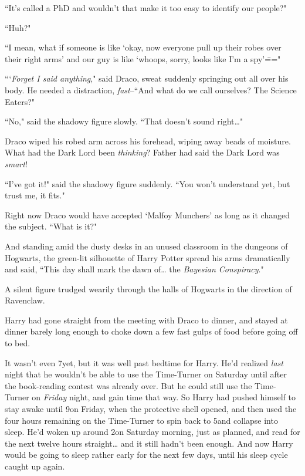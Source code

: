 ``It's called a PhD and wouldn't that make it too easy to identify our people?"

``Huh?"

``I mean, what if someone is like `okay, now everyone pull up their robes over their right arms' and our guy is like `whoops, sorry, looks like I'm a spy'\==="

```\emph{Forget I said anything}," said Draco, sweat suddenly springing out all over his body. He needed a distraction, \emph{fast}\---``And what do we call ourselves? The Science Eaters?"

``No," said the shadowy figure slowly. ``That doesn't sound right{\ldots}"

Draco wiped his robed arm across his forehead, wiping away beads of moisture. What had the Dark Lord been \emph{thinking}? Father had said the Dark Lord was \emph{smart}!

``I've got it!" said the shadowy figure suddenly. ``You won't understand yet, but trust me, it fits."

Right now Draco would have accepted `Malfoy Munchers' as long as it changed the subject. ``What is it?"

And standing amid the dusty desks in an unused classroom in the dungeons of Hogwarts, the green-lit silhouette of Harry Potter spread his arms dramatically and said, ``This day shall mark the dawn of{\ldots} the \emph{Bayesian Conspiracy}."

\later

A silent figure trudged wearily through the halls of Hogwarts in the direction of Ravenclaw.

Harry had gone straight from the meeting with Draco to dinner, and stayed at dinner barely long enough to choke down a few fast gulps of food before going off to bed.

It wasn't even 7\pm yet, but it was well past bedtime for Harry. He'd realized \emph{last} night that he wouldn't be able to use the Time-Turner on Saturday until after the book-reading contest was already over. But he could still use the Time-Turner on \emph{Friday} night, and gain time that way. So Harry had pushed himself to stay awake until 9\pm on Friday, when the protective shell opened, and then used the four hours remaining on the Time-Turner to spin back to 5\pm and collapse into sleep. He'd woken up around 2\am on Saturday morning, just as planned, and read for the next twelve hours straight{\ldots} and it still hadn't been enough. And now Harry would be going to sleep rather early for the next few days, until his sleep cycle caught up again.

